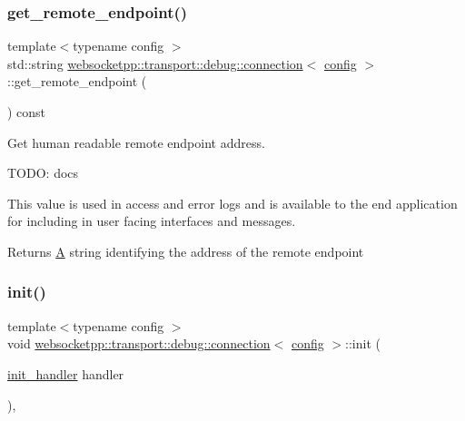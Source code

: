 \subsubsection{\texorpdfstring{get\+\_\+remote\+\_\+endpoint()}{get\_remote\_endpoint()}}
{\footnotesize\ttfamily template$<$typename config $>$ \\
std\+::string \mbox{\hyperlink{classwebsocketpp_1_1transport_1_1debug_1_1connection}{websocketpp\+::transport\+::debug\+::connection}}$<$ \mbox{\hyperlink{classconfig}{config}} $>$\+::get\+\_\+remote\+\_\+endpoint (\begin{DoxyParamCaption}{ }\end{DoxyParamCaption}) const\hspace{0.3cm}{\ttfamily [inline]}}



Get human readable remote endpoint address. 

T\+O\+DO\+: docs

This value is used in access and error logs and is available to the end application for including in user facing interfaces and messages.

\begin{DoxyReturn}{Returns}
\mbox{\hyperlink{struct_a}{A}} string identifying the address of the remote endpoint 
\end{DoxyReturn}
\mbox{\label{classwebsocketpp_1_1transport_1_1debug_1_1connection_a1ed8a6a163997f22ab3977c58514d607}} 
\subsubsection{\texorpdfstring{init()}{init()}}
{\footnotesize\ttfamily template$<$typename config $>$ \\
void \mbox{\hyperlink{classwebsocketpp_1_1transport_1_1debug_1_1connection}{websocketpp\+::transport\+::debug\+::connection}}$<$ \mbox{\hyperlink{classconfig}{config}} $>$\+::init (\begin{DoxyParamCaption}\item[{\mbox{\hyperlink{namespacewebsocketpp_1_1transport_aeae75e675c1a334b3b33ab7120b480a5}{init\+\_\+handler}}}]{handler }\end{DoxyParamCaption})\hspace{0.3cm}{\ttfamily [inline]}, {\ttfamily [protected]}}



